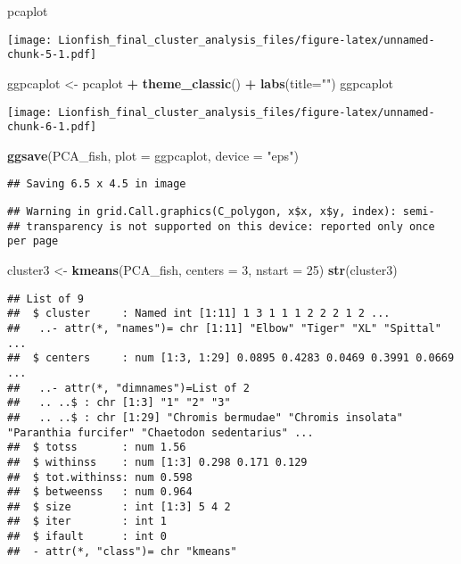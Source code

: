 \documentclass[]{article}
\newenvironment{Shaded}{\begin{snugshade}}{\end{snugshade}}
\newcommand{\KeywordTok}[1]{\textcolor[rgb]{0.13,0.29,0.53}{\textbf{#1}}}
\newcommand{\DataTypeTok}[1]{\textcolor[rgb]{0.13,0.29,0.53}{#1}}
\newcommand{\DecValTok}[1]{\textcolor[rgb]{0.00,0.00,0.81}{#1}}
\newcommand{\StringTok}[1]{\textcolor[rgb]{0.31,0.60,0.02}{#1}}
\newcommand{\OperatorTok}[1]{\textcolor[rgb]{0.81,0.36,0.00}{\textbf{#1}}}
\newcommand{\NormalTok}[1]{#1}
\begin{document}
\begin{Shaded}
\begin{Highlighting}[]
\NormalTok{pcaplot}
\end{Highlighting}
\end{Shaded}

\texttt{[image: Lionfish\_final\_cluster\_analysis\_files/figure-latex/unnamed-chunk-5-1.pdf]}

\begin{Shaded}
\begin{Highlighting}[]
\NormalTok{ggpcaplot <-}\StringTok{ }\NormalTok{pcaplot }\OperatorTok{+}\StringTok{ }\KeywordTok{theme_classic}\NormalTok{() }\OperatorTok{+}\StringTok{ }\KeywordTok{labs}\NormalTok{(}\DataTypeTok{title=}\StringTok{""}\NormalTok{)}
\NormalTok{ggpcaplot}
\end{Highlighting}
\end{Shaded}

\texttt{[image: Lionfish\_final\_cluster\_analysis\_files/figure-latex/unnamed-chunk-6-1.pdf]}

\begin{Shaded}
\begin{Highlighting}[]
\KeywordTok{ggsave}\NormalTok{(PCA_fish, }\DataTypeTok{plot =}\NormalTok{ ggpcaplot, }\DataTypeTok{device =} \StringTok{"eps"}\NormalTok{)}
\end{Highlighting}
\end{Shaded}

\begin{verbatim}
## Saving 6.5 x 4.5 in image
\end{verbatim}

\begin{verbatim}
## Warning in grid.Call.graphics(C_polygon, x$x, x$y, index): semi-
## transparency is not supported on this device: reported only once per page
\end{verbatim}

\begin{Shaded}
\begin{Highlighting}[]
\NormalTok{cluster3 <-}\StringTok{ }\KeywordTok{kmeans}\NormalTok{(PCA_fish, }\DataTypeTok{centers =} \DecValTok{3}\NormalTok{, }\DataTypeTok{nstart =} \DecValTok{25}\NormalTok{)}
\KeywordTok{str}\NormalTok{(cluster3)}
\end{Highlighting}
\end{Shaded}

\begin{verbatim}
## List of 9
##  $ cluster     : Named int [1:11] 1 3 1 1 1 2 2 2 1 2 ...
##   ..- attr(*, "names")= chr [1:11] "Elbow" "Tiger" "XL" "Spittal" ...
##  $ centers     : num [1:3, 1:29] 0.0895 0.4283 0.0469 0.3991 0.0669 ...
##   ..- attr(*, "dimnames")=List of 2
##   .. ..$ : chr [1:3] "1" "2" "3"
##   .. ..$ : chr [1:29] "Chromis bermudae" "Chromis insolata" "Paranthia furcifer" "Chaetodon sedentarius" ...
##  $ totss       : num 1.56
##  $ withinss    : num [1:3] 0.298 0.171 0.129
##  $ tot.withinss: num 0.598
##  $ betweenss   : num 0.964
##  $ size        : int [1:3] 5 4 2
##  $ iter        : int 1
##  $ ifault      : int 0
##  - attr(*, "class")= chr "kmeans"
\end{verbatim}
\end{document}
